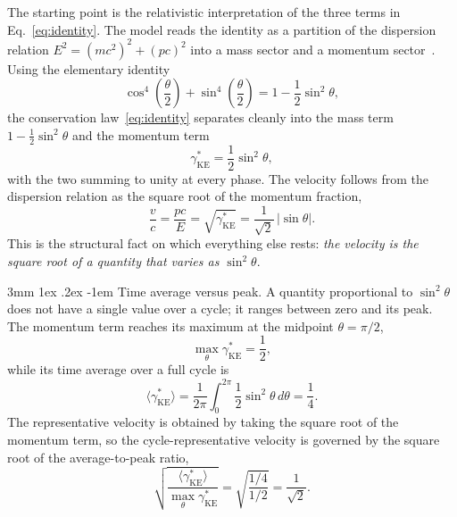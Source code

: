 \documentclass[%
 reprint, amsmath,amssymb, aps, prb, ]{revtex4-2}
\makeatletter
\numberwithin{equation}{section}
\renewcommand\paragraph{%
  \@startsection{paragraph}{4}{\z@}%
    {3mm \@plus 1ex \@minus .2ex}%
    {-1em}%
    {\normalfont\normalsize\itshape}}
\newcommand{\gKE}{\gamma^{*}_{\text{KE}}}
\makeatother
\begin{document}
The starting point is the relativistic interpretation of the three terms in Eq.~\eqref{eq:identity}. The model reads the identity as a partition of the dispersion relation $E^2=(mc^2)^2+(pc)^2$ into a mass sector and a momentum sector~\cite{hanamura07}. Using the elementary identity
\begin{equation}
\cos^4\!\left(\frac{\theta}{2}\right) + \sin^4\!\left(\frac{\theta}{2}\right) = 1 - \frac{1}{2}\sin^2\theta,
\label{eq:tpe-reduce}
\end{equation}
the conservation law~\eqref{eq:identity} separates cleanly into the mass term $1-\tfrac{1}{2}\sin^2\theta$ and the momentum term
\begin{equation}
\gKE = \frac{1}{2}\sin^2\theta,
\label{eq:momentum-term}
\end{equation}
with the two summing to unity at every phase. The velocity follows from the dispersion relation as the square root of the momentum fraction,
\begin{equation}
\frac{v}{c} = \frac{pc}{E} = \sqrt{\gKE} = \frac{1}{\sqrt{2}}\,\lvert\sin\theta\rvert.
\label{eq:velocity-sqrt}
\end{equation}
This is the structural fact on which everything else rests: \emph{the velocity is the square root of a quantity that varies as $\sin^2\theta$}.

\paragraph{Time average versus peak.}
A quantity proportional to $\sin^2\theta$ does not have a single value over a cycle; it ranges between zero and its peak. The momentum term reaches its maximum at the midpoint $\theta=\pi/2$,
\begin{equation}
\max_\theta \gKE = \frac{1}{2},
\label{eq:peak}
\end{equation}
while its time average over a full cycle is
\begin{equation}
\langle \gKE \rangle = \frac{1}{2\pi}\int_0^{2\pi}\frac{1}{2}\sin^2\theta\,d\theta = \frac{1}{4}.
\label{eq:average}
\end{equation}
The representative velocity is obtained by taking the square root of the momentum term, so the cycle-representative velocity is governed by the square root of the average-to-peak ratio,
\begin{equation}
\sqrt{\frac{\langle \gKE \rangle}{\max_\theta \gKE}} = \sqrt{\frac{1/4}{1/2}} = \frac{1}{\sqrt{2}}.
\label{eq:rms-origin}
\end{equation}
\end{document}
